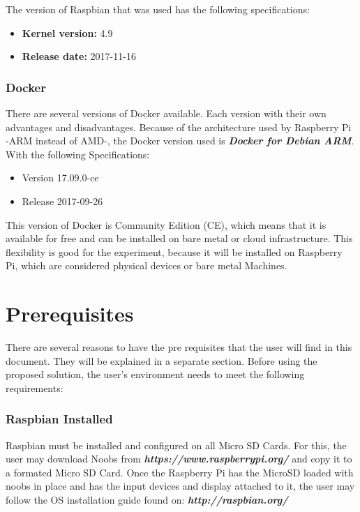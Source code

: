 \documentclass[sigconf]{acmart}
\begin{document}
	The version of Raspbian that was used has the following specifications:
	
	\begin{itemize}
	\item 	\textbf{Kernel version:} 4.9
	\item 	\textbf{Release date:} 2017-11-16
	\end{itemize}
	
	\subsubsection{Docker}

	There are several versions of Docker available. Each version with their own advantages and disadvantages. Because of the architecture used by Raspberry Pi -ARM instead of AMD-, the Docker version used is 	\textbf{\textit{Docker for Debian ARM}}. With the following Specifications:
	
	\begin{itemize}
	\item Version 17.09.0-ce
	\item Release 2017-09-26
	\end{itemize}
	
	This version of Docker is Community Edition (CE), which means that it is available for free and can be installed on bare metal or cloud infrastructure. This flexibility is good for the experiment, because it will be installed on Raspberry Pi, which are considered physical devices or bare metal Machines.
	\cite{dockerdoc2017}
	
	\section{Prerequisites}
	
	There are several reasons to have the pre requisites that the user will find in this document. They will be explained in a separate section. Before using the proposed solution, the user’s environment needs to meet the following requirements:
	
	\subsubsection{Raspbian Installed}
	Raspbian must be installed and configured on all Micro SD Cards.
	For this, the user may download Noobs from 	\textbf{\textit{https://www.raspberrypi.org/}} and copy it to a formated Micro SD Card.
	Once the Raspberry Pi has the MicroSD loaded with noobs in place and has the input devices and display attached to it, the user may follow the OS installation guide found on: \textbf{\textit{http://raspbian.org/}}
	
\end{document}
